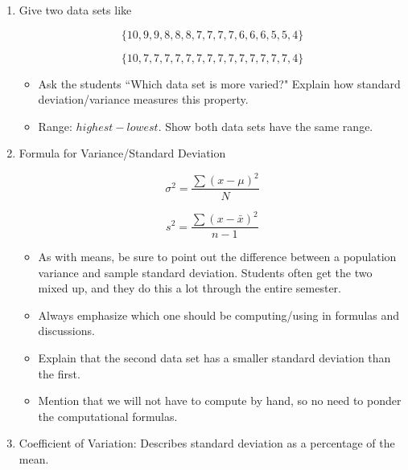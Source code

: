\documentclass{article}
\begin{document}
\begin{enumerate}

    \item Give two data sets like

        $$\{10, 9, 9, 8, 8, 8, 7, 7, 7, 7, 6, 6, 6, 5, 5, 4\}$$

        $$\{10, 7, 7, 7, 7, 7, 7, 7, 7, 7, 7, 7, 7, 7, 7, 4\}$$
    \begin{itemize}
    
        \item Ask the students ``Which data set is more varied?" Explain how standard deviation/variance measures this property. 
        
        \item Range: $highest-lowest$. Show both data sets have the same range.
        
    \end{itemize}


    \item Formula for Variance/Standard Deviation
    
    $$\sigma^2 = \frac{ \sum (x-\mu)^2}{N}$$
    
    $$s^2 = \frac{ \sum (x-\bar{x})^2}{n-1}$$
    
        \begin{itemize}
        
            \item As with means, be sure to point out the difference between a population variance and sample standard deviation. Students often get the two mixed up, and they do this a lot through the entire semester.
            
            \item Always emphasize which one should be computing/using in formulas and discussions.
            
            \item Explain that the second data set has a smaller standard deviation than the first.
            
            \item Mention that we will not have to compute by hand, so no need to ponder the computational formulas.

        \end{itemize}

    \item Coefficient of Variation: Describes standard deviation as a percentage of the mean.
    
        \begin{itemize}
        

\end{itemize}
\end{enumerate}
\end{document}
